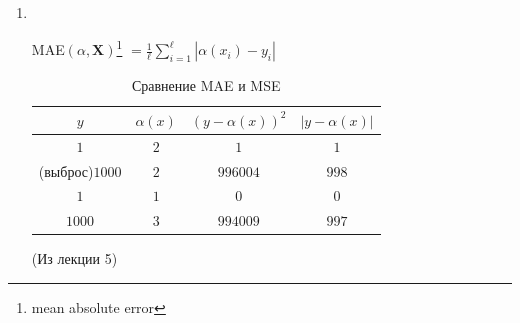 \begin{enumerate}
            \item {}\\
                \begin{center}
                    \large{MAE$(\alpha, \mathbf{X})$\footnote{mean absolute error} $= \frac{1}{\ell}\sum\limits_{i=1}^\ell |\alpha(x_i) - y_i|$}
                \end{center}

                \begin{table}[ht]
                \centering
                \begin{tabular}{|c|c|c|c|}
                \hline
                $y$ & $\alpha(x)$ & $(y - \alpha(x))^2$ & $|y - \alpha(x)|$ \\
                \hline
                $1$ & $2$ & $1$ & $1$\\
        
                (выброс)$1000$ & $2$ & $996004$ & $998$\\
                \hline
                $1$ & $1$ & $0$ & $0$\\ 
                
                $1000$ & $3$ & $994009$ & $997$\\
                \hline
                \end{tabular}
                \caption{Сравнение MAE и MSE}
                \end{table}


                \begin{center}
                     (Из лекции 5)
                    
                \end{center}


\end{enumerate}
